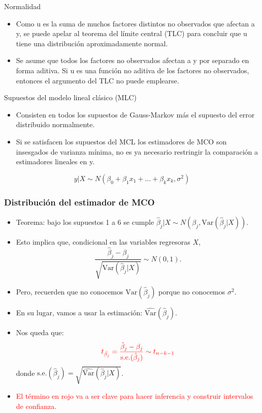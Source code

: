 \documentclass{beamer}
\begin{document}
\begin{frame}{Normalidad}
\begin{itemize}
    \item  Como u es la suma de muchos factores distintos no observados que afectan a y, se puede apelar
al teorema del límite central (TLC)  para concluir que u tiene una distribución
aproximadamente normal.

\item Se asume que todos los factores
no observados afectan a y por separado en forma aditiva.  Si u
es una  función no aditiva de los factores no observados, entonces el argumento del TLC no
puede emplearse.
\end{itemize}
\end{frame}
\begin{frame}{Supuestos del modelo lineal clásico (MLC)}

\begin{itemize}
\item Consisten en todos los supuestos de Gauss-Markov más el supuesto  del error
distribuido normalmente.
    \item Si se satisfacen los supuestos del MCL los estimadores de MCO son insesgados de varianza mínima, no es ya necesario restringir la
comparación a estimadores lineales en y.
\end{itemize}

{\color{blue} $$ y|X\sim N(\beta_0+\beta_1x_1+...+\beta_kx_k, \sigma^2)$$}

\end{frame}



\begin{frame}[shrink=10]
\frametitle{Distribución del estimador de MCO}
\begin{itemize}
    \item Teorema: bajo los supuestos 1 a 6 se cumple $\hat{\beta}_j|X \sim N(\beta_j, \text{Var}(\hat{\beta}_j|X))$.
    \item Esto implica que, condicional en las variables regresoras $X$,
    $$\frac{\hat{\beta}_j - \beta_j}{\sqrt{\text{Var}(\hat{\beta}_j|X)}} \sim N(0, 1).$$
    \item Pero, recuerden que no conocemos $\text{Var}(\hat{\beta}_j)$ porque no conocemos $\sigma^2$.
    \item En su lugar, vamos a usar la estimación: $\hat{\text{Var}}(\hat{\beta}_j)$.
    \item Nos queda que:
    $$\color{red}t_{\hat{\beta_j}}=\frac{\hat{\beta}_j - \beta_j}{\text{s.e.}(\hat{\beta}_j)} \sim t_{n-k-1}$$
    donde $\text{s.e.}(\hat{\beta}_j) = \sqrt{\hat{\text{Var}}(\hat{\beta}_j|X)}$.
    \item \textcolor{red}{El término en rojo va a ser clave para hacer inferencia y construir intervalos de confianza.}
\end{itemize}
\end{frame}
\end{document}
